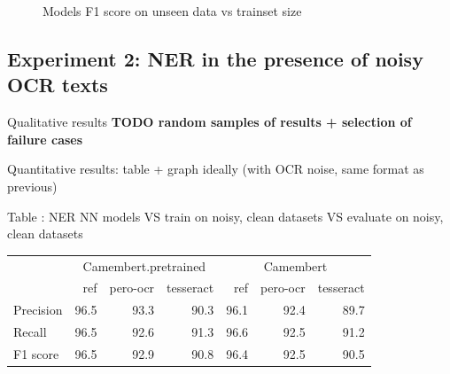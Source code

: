 \begin{figure}[h!]
	  \vspace{3in}
	  \caption{\label{fig:f1-vs-trainsize} Models F1 score on unseen data vs trainset size}
\end{figure}
	                                        


\subsection{Experiment 2: NER in the presence of noisy OCR texts}

Qualitative results
\textbf{TODO random samples of results + selection of failure cases}

Quantitative results: table + graph ideally (with OCR noise, same format as previous)

Table : NER NN models VS train on {noisy, clean} datasets VS evaluate on {noisy, clean} datasets

\begin{tabular}{lrrrrrr}
{} & \multicolumn{3}{c}{Camembert.pretrained} & \multicolumn{3}{c}{Camembert} \\
{} &                  ref & pero-ocr & tesseract &       ref & pero-ocr & tesseract \\
\midrule
Precision &                 96.5 &     93.3 &      90.3 &      96.1 &     92.4 &      89.7 \\
Recall    &                 96.5 &     92.6 &      91.3 &      96.6 &     92.5 &      91.2 \\
F1 score        &                 96.5 &     92.9 &      90.8 &      96.4 &     92.5 &      90.5 \\
\bottomrule
\end{tabular}


